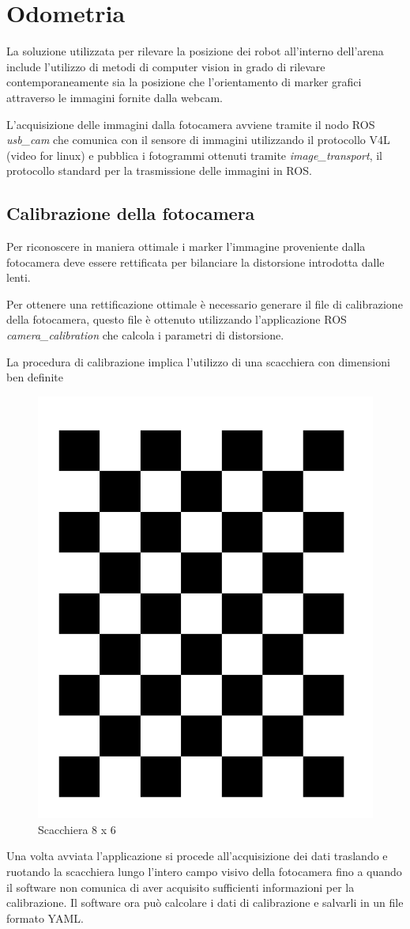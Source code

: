 \chapter{Odometria}
	La soluzione utilizzata per rilevare la posizione dei robot all'interno dell'arena include l'utilizzo di metodi di computer vision in grado di rilevare contemporaneamente sia la posizione che l'orientamento di marker grafici attraverso le immagini fornite dalla webcam.
	
	L'acquisizione delle immagini dalla fotocamera avviene tramite il nodo ROS \emph{usb\_cam} che comunica con il sensore di immagini utilizzando il protocollo V4L (video for linux) e pubblica i fotogrammi ottenuti tramite \emph{image\_transport}, il protocollo standard per la trasmissione delle immagini in ROS.

\section{Calibrazione della fotocamera}
	Per riconoscere in maniera ottimale i marker l'immagine proveniente dalla fotocamera deve essere rettificata per bilanciare la distorsione introdotta dalle lenti.
	
	Per ottenere una rettificazione ottimale \`e necessario generare il file di calibrazione della fotocamera, questo file \`e ottenuto utilizzando l'applicazione ROS \emph{camera\_calibration} che calcola i parametri di distorsione.
	
	La procedura di calibrazione implica l'utilizzo di una scacchiera con dimensioni ben definite
	\begin{figure}[H]
	\centering
	\includegraphics[width=0.4\linewidth, angle=90]{./images/check-108}
	\caption{Scacchiera 8 x 6}
	\label{fig:check-108}
	\end{figure}

	Una volta avviata l'applicazione si procede all'acquisizione dei dati traslando e ruotando la scacchiera lungo l'intero campo visivo della fotocamera fino a quando il software non comunica di aver acquisito sufficienti informazioni per la calibrazione. Il software ora pu\`o calcolare i dati di calibrazione e salvarli in un file formato YAML.
	

